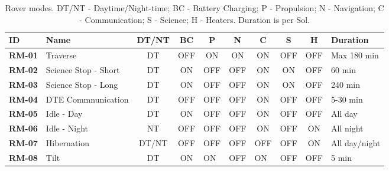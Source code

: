 \begin{table}[h]
\footnotesize
\centering
\caption{Rover modes. DT/NT - Daytime/Night-time; BC - Battery Charging; P - Propulsion; N - Navigation; C - Communication; S - Science; H - Heaters. Duration is per Sol.}
\label{tab:rover-modes}
\begin{tabular}{|l|l|c|c|c|c|c|c|c|l|}
\hline
\textbf{ID} & \textbf{Name} & \textbf{DT/NT} & \textbf{BC} & \textbf{P} & \textbf{N} & \textbf{C} & \textbf{S} & \textbf{H} & \textbf{Duration} \\ \hline
\textbf{RM-01} & Traverse & DT & OFF & ON & ON & ON & OFF & OFF & Max 180 min \\ \hline
\textbf{RM-02} & Science Stop - Short & DT & ON & OFF & OFF & ON & ON & OFF & 60 min \\ \hline
\textbf{RM-03} & Science Stop - Long & DT & ON & OFF & OFF & ON & ON & OFF & 240 min \\ \hline
\textbf{RM-04} & \ac{DTE} Commnunication & DT & OFF & OFF & OFF & ON & OFF & OFF & 5-30 min \\ \hline
\textbf{RM-05} & Idle - Day & DT & ON & OFF & OFF & ON & OFF & OFF & All day \\ \hline
\textbf{RM-06} & Idle - Night & NT & OFF & OFF & OFF & ON & OFF & ON & All night \\ \hline
\textbf{RM-07} & Hibernation & DT/NT & OFF & OFF & OFF & OFF & OFF & ON & All day/night \\ \hline
\textbf{RM-08} & Tilt & DT & ON & \multicolumn{1}{l|}{ON} & \multicolumn{1}{l|}{OFF} & \multicolumn{1}{l|}{ON} & \multicolumn{1}{l|}{OFF} & \multicolumn{1}{l|}{OFF} & 5 min \\ \hline
\end{tabular}
\end{table}
